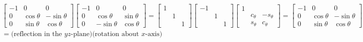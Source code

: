 \documentclass[twoside]{amsart}
\theoremstyle{plain}
\theoremstyle{definition}
\begin{document}
\begin{enumerate}
\[
\begin{gathered}
  \left[ \begin{matrix} -1 & 0 & 0 \\ 0 & \cos{\theta} & - \sin{\theta} \\ 0 & \sin{\theta} & \cos{\theta} \end{matrix} \right]\left[ \begin{matrix} -1 & 0 & 0 \\ 0 & \cos{\theta} & \sin{\theta} \\ 0 & -\sin{\theta} & \cos{\theta} \end{matrix} \right] = \left[ \begin{matrix} 1 & & \\ & 1 & \\ & & 1 \end{matrix} \right]
  \left[ \begin{matrix} -1 & & \\ & 1 & \\ & & 1 \end{matrix} \right]\left[ \begin{matrix} 1 & & \\ & c_{\theta} & -s_{\theta} \\ & s_{\theta} & c_{\theta} \end{matrix} \right] = \left[ \begin{matrix} -1 & 0 & 0 \\ 0 & \cos{\theta} & - \sin{\theta} \\ 0 & \sin{\theta} & \cos{\theta} \end{matrix} \right] = \\ = \text{(reflection in the $yz$-plane)}\text{(rotation about $x$-axis)}
\end{gathered}
\]
\end{enumerate}
\end{document}
